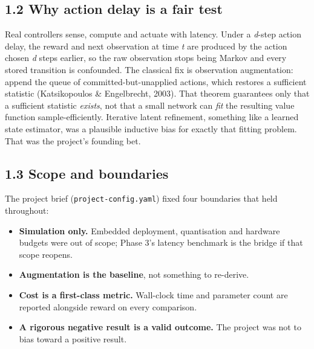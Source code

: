 \documentclass[11pt]{article}
\begin{document}
\subsection*{1.2 Why action delay is a fair test}



Real controllers sense, compute and actuate with latency. Under a \emph{d}-step action delay, the reward and next observation at time \emph{t} are produced by the action chosen \emph{d} steps earlier, so the raw observation stops being Markov and every stored transition is confounded. The classical fix is observation augmentation: append the queue of committed-but-unapplied actions, which restores a sufficient statistic (Katsikopoulos \& Engelbrecht, 2003). That theorem guarantees only that a sufficient statistic \emph{exists}, not that a small network can \emph{fit} the resulting value function sample-efficiently. Iterative latent refinement, something like a learned state estimator, was a plausible inductive bias for exactly that fitting problem. That was the project's founding bet.



\subsection*{1.3 Scope and boundaries}



The project brief (\texttt{project-config.\allowbreak{}yaml}) fixed four boundaries that held throughout:



\begin{itemize}
\item \textbf{Simulation only.} Embedded deployment, quantisation and hardware budgets were out of scope; Phase 3's latency benchmark is the bridge if that scope reopens.
\item \textbf{Augmentation is the baseline}, not something to re-derive.
\item \textbf{Cost is a first-class metric.} Wall-clock time and parameter count are reported alongside reward on every comparison.
\item \textbf{A rigorous negative result is a valid outcome.} The project was not to bias toward a positive result.
\end{itemize}
\end{document}
